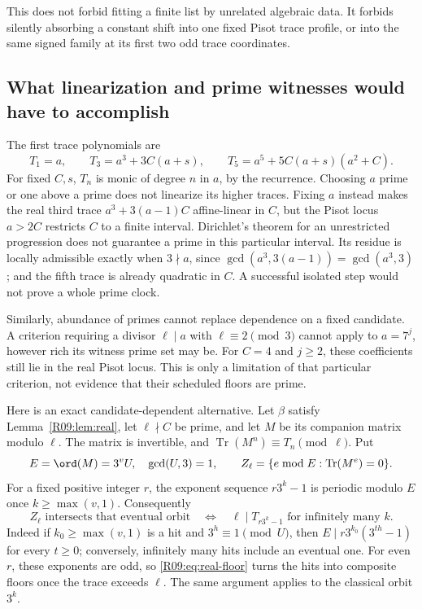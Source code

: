 \documentclass[11pt,a4paper]{article}
\theoremstyle{definition}\newtheorem{definition}[theorem]{Definition}
\theoremstyle{remark}\newtheorem{remark}[theorem]{Remark}
\DeclareMathOperator{\Tr}{Tr}\DeclareMathOperator{\tr}{tr}\DeclareMathOperator{\Nm}{N}
\begin{document}
This does not forbid fitting a finite list by unrelated algebraic
data. It forbids silently absorbing a constant shift into one fixed
Pisot trace profile, or into the same signed family at its first two
odd trace coordinates.

\subsection{What linearization and prime witnesses would have to accomplish}

The first trace polynomials are
\[
 T_1=a,\qquad T_3=a^3+3C(a+s),\qquad
 T_5=a^5+5C(a+s)(a^2+C).
\]
For fixed $C,s$, $T_n$ is monic of degree $n$ in $a$, by the recurrence.
Choosing $a$ prime or one above a prime does not linearize its higher
traces. Fixing $a$ instead makes the real third trace
$a^3+3(a-1)C$ affine-linear in $C$, but the Pisot locus $a>2C$ restricts
$C$ to a finite interval. Dirichlet's theorem for an unrestricted
progression does not guarantee a prime in this particular interval.
Its residue is locally admissible exactly when $3\nmid a$, since
$\gcd(a^3,3(a-1))=\gcd(a^3,3)$; and the fifth trace is already quadratic
in $C$. A successful isolated step would not prove a whole prime clock.

Similarly, abundance of primes cannot replace dependence on a fixed
candidate. A criterion requiring a divisor $\ell\mid a$ with
$\ell\equiv2\pmod3$ cannot apply to $a=7^j$, however rich its witness
prime set may be. For $C=4$ and $j\ge2$, these coefficients still lie
in the real Pisot locus. This is only a limitation of that particular
criterion, not evidence that their scheduled floors are prime.

Here is an exact candidate-dependent alternative. Let $\beta$ satisfy
Lemma~\ref{R09:lem:real}, let $\ell\nmid C$ be prime, and let $M$ be its
companion matrix modulo $\ell$. The matrix is invertible, and
$\Tr(M^n)\equiv T_n\pmod\ell$. Put
\[
 E=\ord(M)=3^vU,\quad \gcd(U,3)=1,\qquad
 Z_\ell=\{e\bmod E:\Tr(M^e)=0\}.
\]
For a fixed positive integer $r$, the exponent sequence $r3^k-1$ is
periodic modulo $E$ once $k\ge\max(v,1)$. Consequently
\begin{equation}\label{R09:eq:orbit}
 Z_\ell\text{ intersects that eventual orbit}
 \quad\Longleftrightarrow\quad
 \ell\mid T_{r3^k-1}\text{ for infinitely many }k.
\end{equation}
Indeed if $k_0\ge\max(v,1)$ is a hit and $3^h\equiv1\pmod U$, then
$E\mid r3^{k_0}(3^{th}-1)$ for every $t\ge0$; conversely, infinitely
many hits include an eventual one. For even $r$, these exponents are
odd, so \eqref{R09:eq:real-floor} turns the hits into composite floors once
the trace exceeds $\ell$. The same argument applies to the classical
orbit $3^k$.
\end{document}
